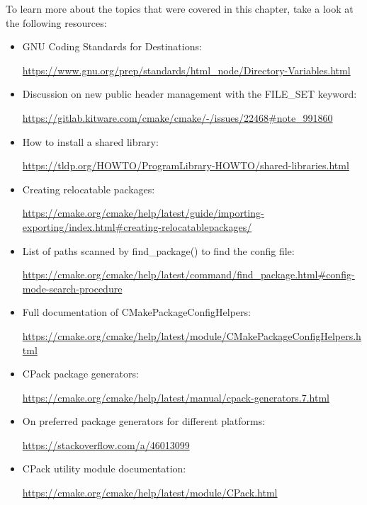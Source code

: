 To learn more about the topics that were covered in this chapter, take a look at the following resources:

\begin{itemize}
\item 
GNU Coding Standards for Destinations:

\url{https://www.gnu.org/prep/standards/html_node/Directory-Variables.html}

\item 
Discussion on new public header management with the FILE\_SET keyword:

\url{https://gitlab.kitware.com/cmake/cmake/-/issues/22468\#note_991860}

\item 
How to install a shared library:

\url{https://tldp.org/HOWTO/ProgramLibrary-HOWTO/shared-libraries.html}

\item 
Creating relocatable packages: 

\url{https://cmake.org/cmake/help/latest/guide/importing-exporting/index.html\#creating-relocatablepackages/}

\item 
List of paths scanned by find\_package() to find the config file:

\url{https://cmake.org/cmake/help/latest/command/find_package.html\#config-mode-search-procedure}

\item 
Full documentation of CMakePackageConfigHelpers:

\url{https://cmake.org/cmake/help/latest/module/CMakePackageConfigHelpers.html}

\item 
CPack package generators:

\url{https://cmake.org/cmake/help/latest/manual/cpack-generators.7.html}

\item 
On preferred package generators for different platforms: 

\url{https://stackoverflow.com/a/46013099}

\item 
CPack utility module documentation: 

\url{https://cmake.org/cmake/help/latest/module/CPack.html}
\end{itemize}